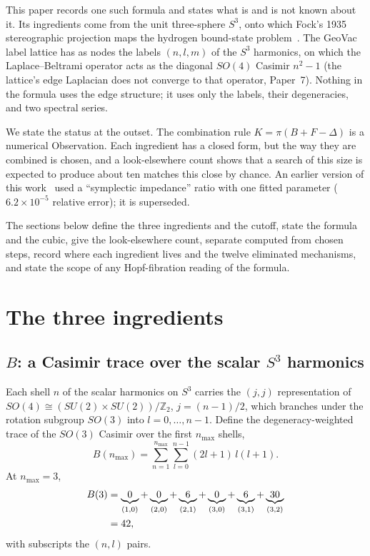 \documentclass[aps,prl,twocolumn,superscriptaddress]{revtex4-2}
\newcommand{\gvq}[2]{#2}
\begin{document}
This paper records one such formula and states what is and is not
known about it. Its ingredients come from the unit three-sphere $S^3$,
onto which Fock's 1935 stereographic projection maps the hydrogen
bound-state problem~\cite{fock1935,paper7}. The GeoVac label lattice
has as nodes the labels $(n,l,m)$ of the $S^3$ harmonics, on which the
Laplace--Beltrami operator acts as the diagonal $SO(4)$ Casimir
$n^2-1$ (the lattice's edge Laplacian does not converge to that
operator, Paper~7). Nothing in the formula uses the edge structure; it
uses only the labels, their degeneracies, and two spectral series.

We state the status at the outset. The combination rule
$K = \pi(B + F - \Delta)$ is a numerical Observation. Each ingredient
has a closed form, but the way they are combined is chosen, and a
look-elsewhere count shows that a search
of this size is expected to produce about ten matches this close by
chance. An earlier version of this work~\cite{alpha_hopf_v1} used a
``symplectic impedance'' ratio with one fitted parameter
($6.2\times10^{-5}$ relative error); it is superseded.

The sections below define the three ingredients and the cutoff, state
the formula and the cubic, give the look-elsewhere count, separate
computed from chosen steps, record where each ingredient lives and the
twelve eliminated mechanisms, and state the scope of any
Hopf-fibration reading of the formula.


\section{The three ingredients}\label{sec:ingredients}

\subsection{$B$: a Casimir trace over the scalar $S^3$ harmonics}

Each shell $n$ of the scalar harmonics on $S^3$ carries the $(j,j)$
representation of $SO(4) \cong (SU(2)\times SU(2))/\mathbb{Z}_2$,
$j = (n-1)/2$, which branches under the rotation subgroup $SO(3)$ into
$l = 0, \ldots, n-1$. Define the degeneracy-weighted trace of the
$SO(3)$ Casimir over the first $n_{\max}$ shells,
\begin{equation}\label{eq:casimir}
  B(n_{\max}) = \sum_{n=1}^{n_{\max}} \sum_{l=0}^{n-1}
  (2l+1)\,l(l+1).
\end{equation}
At $n_{\max} = 3$,
\begin{align}
  B(3) &= \underbrace{0}_{(1,0)}
         + \underbrace{0}_{(2,0)} + \underbrace{6}_{(2,1)}
         + \underbrace{0}_{(3,0)} + \underbrace{6}_{(3,1)}
         + \underbrace{30}_{(3,2)} \notag \\
       &= \gvq{b_casimir}{42},
\end{align}
with subscripts the $(n,l)$ pairs.
\end{document}
